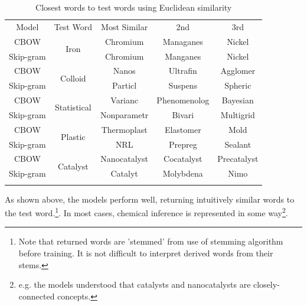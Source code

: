 \begin{table}[h!]
\begin{center}
\caption[Word similarity examinations with euclidean similarity]{Closest words to test words using Euclidean similarity}
\label{tab:EUCLIDSIMS}
\begin{tabular}{||c||c|c|c|c||}
\hline
Model     & Test Word              & Most Similar & 2nd & 3rd \\ \hhline{||=||=|=|=|=||}
CBOW      & \multirow{2}{*}{Iron} & Chromium             &  Managanes   &   Nickel  \\ \cline{1-1} \cline{3-5} 
Skip-gram &                   &  Chromium            &   Manganes  &  Nickel   \\ 
\hhline{||=||=|=|=|=||}
CBOW      & \multirow{2}{*}{Colloid} & Nanos             &  Ultrafin   &   Agglomer  \\ \cline{1-1} \cline{3-5} 
Skip-gram &                   &  Particl            &   Suspens  &  Spheric   \\ 
\hhline{||=||=|=|=|=||}
CBOW      & \multirow{2}{*}{Statistical} & Varianc             &  Phenomenolog   &   Bayesian  \\ \cline{1-1} \cline{3-5} 
Skip-gram &                   &  Nonparametr            &   Bivari  &  Multigrid   \\ 
\hhline{||=||=|=|=|=||}
CBOW      & \multirow{2}{*}{Plastic} & Thermoplast             &  Elastomer   & Mold    \\ \cline{1-1} \cline{3-5} 
Skip-gram &                   &  NRL            &   Prepreg  &  Sealant   \\ 
\hhline{||=||=|=|=|=||}
CBOW      & \multirow{2}{*}{Catalyst} & Nanocatalyst             &  Cocatalyst   & Precatalyst    \\ \cline{1-1} \cline{3-5} 
Skip-gram &                   &  Catalyt            &   Molybdena  &  Nimo   \\ 
\hhline{||=||=|=|=|=||}
\end{tabular}
\end{center}
\end{table}
As shown above, the models perform well, returning intuitively similar words to the test word.\footnote{Note that returned words are 'stemmed' from use of stemming algorithm before training. It is not difficult to interpret derived words from their stems.}. In most cases, chemical inference is represented in some way\footnote{e.g. the models understood that catalysts and nanocatalysts are closely-connected concepts.}.


